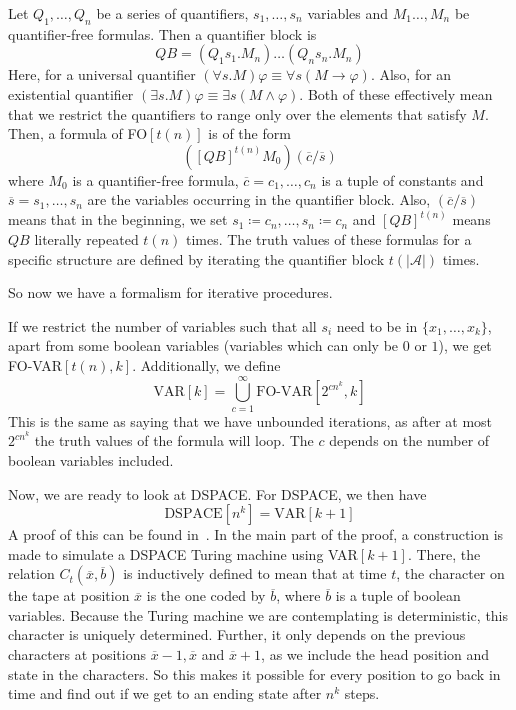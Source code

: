 \begin{define}[{FO$[t(n)]$}]
    Let $Q_1, \dots, Q_n$ be a series of quantifiers, $s_1, \dots, s_n$ variables and $M_1 \dots, M_n$ be quantifier-free formulas.
    Then a quantifier block is \[QB = (Q_{1}s_{1}.M_{n})\dots(Q_{n}s_{n}.M_{n})\]
    Here, for a universal quantifier $(\forall s.M)\varphi \equiv \forall s (M \to \varphi)$.
    Also, for an existential quantifier $(\exists s.M)\varphi \equiv \exists s(M \land \varphi)$.
    Both of these effectively mean that we restrict the quantifiers to range only over the elements that satisfy $M$.
    Then, a formula of FO$[t(n)]$ is of the form
    \[
        \left([QB]^{t(n)}M_{0}\right)(\overline{c} / \overline{s})
    \]
    where $M_0$ is a quantifier-free formula, $\overline{c} = c_1, \dots, c_n$ is a tuple of constants and $\overline{s} = s_1, \dots, s_n$ are the variables occurring in the quantifier block.
    Also, $(\overline{c} / \overline{s})$ means that in the beginning, we set $s_1 \coloneqq c_n, \dots, s_n \coloneqq c_n$ and $[QB]^{t(n)}$ means $QB$ literally repeated $t(n)$ times.
    The truth values of these formulas for a specific structure are defined by iterating the quantifier block $t(|\mathcal{A}|)$ times.
\end{define}
So now we have a formalism for iterative procedures.

If we restrict the number of variables such that all $s_i$ need to be in $\{x_1, \dots, x_k \}$, apart from some boolean variables (variables which can only be $0$ or $1$), we get FO-VAR$[t(n), k]$.
Additionally, we define
\[
    \text{VAR}[k] = \bigcup_{c = 1}^{\infty}\text{FO-VAR}[2^{cn^k}, k]
\]
This is the same as saying that we have unbounded iterations, as after at most $2^{cn^k}$ the truth values of the formula will loop.
The $c$ depends on the number of boolean variables included.

Now, we are ready to look at DSPACE\@.
For DSPACE, we then have
\[
    \text{DSPACE}[n^k] = \text{VAR}[k + 1]
\]
A proof of this can be found in~\cite{descriptive-complexity}.
In the main part of the proof, a construction is made to simulate a DSPACE Turing machine using VAR$[k + 1]$.
There, the relation $C_{t}(\overline{x}, \overline{b})$ is inductively defined to mean that at time $t$, the character on the tape at position $\overline{x}$ is the one coded by $\overline{b}$, where $\overline{b}$ is a tuple of boolean variables.
Because the Turing machine we are contemplating is deterministic, this character is uniquely determined.
Further, it only depends on the previous characters at positions $\overline{x} - 1, \overline{x}$ and $\overline{x} + 1$, as we include the head position and state in the characters.
So this makes it possible for every position to go back in time and find out if we get to an ending state after $n^k$ steps.

